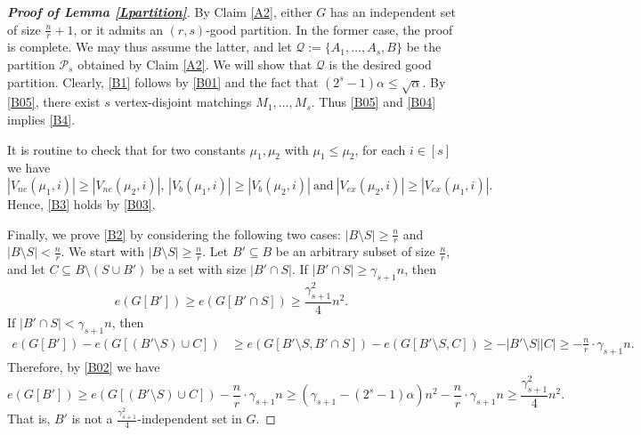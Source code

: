 \documentclass[11pt, a4paper]{article}
\theoremstyle{definition}
\newcommand{\<}{\subseteq}
\begin{document}
\begin{proof}[\bf Proof of Lemma \ref{Lpartition}]
By Claim \ref{A2}, either $G$ has an  independent set of size $\frac{n}{r}+1$, or it admits an $(r,s)$-good partition. In the former case, the proof is complete. We may thus assume the latter, and let $\mathcal{Q}:=\{A_1,\ldots,A_s,B\}$ be the partition $\mathcal{P}_s$ obtained by Claim \ref{A2}. We will show that $\mathcal{Q}$ is the desired good partition. Clearly, \ref{B1} follows by \ref{B01} and the fact that $(2^s-1)\alpha \le \sqrt{\alpha}$. By \ref{B05}, there exist $s$ vertex-disjoint matchings $M_1,\dots, M_s$. %
 Thus \ref{B05} and \ref{B04} implies \ref{B4}.

It is routine to check that for two constants  $\mu_1,\mu_2$ with  $\mu_1\le \mu_2$, for each $i\in [s]$ we have  
$$
|V_{ne}(\mu_1,i)|\ge |V_{ne}(\mu_2,i)|,\,|V_{b}(\mu_1,i)|\ge |V_{b}(\mu_2,i)|\ \text{and}\ |V_{ex}(\mu_2,i)|\ge |V_{ex}(\mu_1,i)|.
$$ 
Hence, \ref{B3} holds  by \ref{B03}.

Finally, we prove \ref{B2} by considering the following two cases: $|B\setminus S|\ge \frac{n}{r}$ and $|B\setminus S| < \frac{n}{r}$. We start with $|B\setminus S| \ge \frac{n}{r}$. Let $B' \subseteq B$ be an arbitrary  subset of size $\frac{n}{r}$,  %
and let $C\subseteq B\setminus (S\cup B')$ be a set with size $|B'\cap S|$. If $|B'\cap S|\geq \gamma_{s+1}n$, then 
$$
e(G[B'])\geq e(G[B' \cap S])\geq \frac{\gamma_{s+1}^2}{4}n^2.
$$
If $|B'\cap S|<\gamma_{s+1}n$, then 
\begin{align*}
    e(G[B'])-e(G[(B'\setminus S)\cup C])&\geq e(G[B'\setminus S,B'\cap S])-e(G[B'\setminus S,C])\geq -|B'\setminus S||C|\geq -\frac{n}{r}\cdot \gamma_{s+1}n.
\end{align*}
Therefore, by \ref{B02} we have 
$$
e(G[B'])\geq e(G[(B'\setminus S)\cup C])-\frac{n}{r}\cdot \gamma_{s+1}n\geq (\gamma_{s+1}-(2^s-1)\alpha)n^2-\frac{n}{r}\cdot \gamma_{s+1}n 
    \geq \frac{\gamma_{s+1}^2}{4}n^2.
$$
That is, $B'$ is not a $\frac{\gamma_{s+1}^2}{4}$-independent set in $G$. 





\end{proof}
\end{document}
